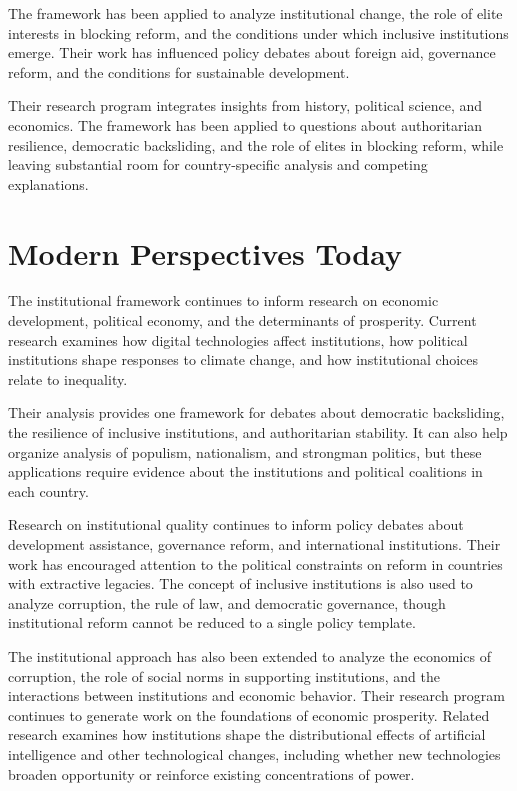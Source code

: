 The framework has been applied to analyze institutional change, the role of
elite interests in blocking reform, and the conditions under which inclusive
institutions emerge. Their work has influenced policy debates about foreign
aid, governance reform, and the conditions for sustainable development.

Their research program integrates insights from history, political science, and
economics. The framework has been applied to questions about authoritarian
resilience, democratic backsliding, and the role of elites in blocking reform,
while leaving substantial room for country-specific analysis and competing
explanations.

\section{Modern Perspectives Today}
The institutional framework continues to inform research on economic
development, political economy, and the determinants of prosperity. Current
research examines how digital technologies affect institutions, how political
institutions shape responses to climate change, and how institutional choices
relate to inequality.

Their analysis provides one framework for debates about democratic backsliding,
the resilience of inclusive institutions, and authoritarian stability. It can
also help organize analysis of populism, nationalism, and strongman politics,
but these applications require evidence about the institutions and political
coalitions in each country.

Research on institutional quality continues to inform policy debates about
development assistance, governance reform, and international institutions.
Their work has encouraged attention to the political constraints on reform in
countries with extractive legacies. The concept of inclusive institutions is
also used to analyze corruption, the rule of law, and democratic governance,
though institutional reform cannot be reduced to a single policy template.

The institutional approach has also been extended to analyze the economics
of corruption, the role of social norms in supporting institutions, and the
interactions between institutions and economic behavior. Their research program
continues to generate work on the foundations of economic prosperity. Related
research examines how institutions shape the distributional effects of
artificial intelligence and other technological changes, including whether new
technologies broaden opportunity or reinforce existing concentrations of power.

